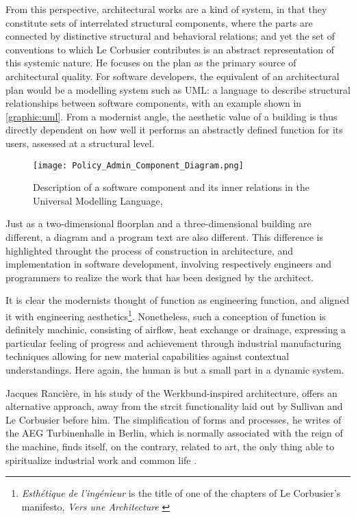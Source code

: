 From this perspective, architectural works are a kind of system, in that they constitute sets of interrelated structural components, where the parts are connected by distinctive structural and behavioral relations; and yet the set of conventions to which Le Corbusier contributes is an abstract representation of this systemic nature. He focuses on the plan as the primary source of architectural quality. For software developers, the equivalent of an architectural plan would be a modelling system such as UML: a language to describe structural relationships between software components, with an example shown in \autoref{graphic:uml}. From a modernist angle, the aesthetic value of a building is thus directly dependent on how well it performs an abstractly defined function for its users, assessed at a structural level.

\begin{figure}
    \texttt{[image: Policy\_Admin\_Component\_Diagram.png]}
    \caption{Description of a software component and its inner relations in the Universal Modelling Language, \citep{wikipedia_unified_2023}}
    \label{graphic:uml}
\end{figure}

Just as a two-dimensional floorplan and a three-dimensional building are different, a diagram and a program text are also different. This difference is highlighted throught the process of construction in architecture, and implementation in software development, involving respectively engineers and programmers to realize the work that has been designed by the architect.

It is clear the modernists thought of function as engineering function, and aligned it with engineering aesthetics\footnote{\emph{Esthétique de l'ingénieur} is the title of one of the chapters of Le Corbusier's manifesto, \emph{Vers une Architecture} \citep{lecorbusier_vers_1923}}. Nonetheless, such a conception of function is definitely machinic, consisting of airflow, heat exchange or drainage, expressing a particular feeling of progress and achievement through industrial manufacturing techniques allowing for new material capabilities against contextual understandings. Here again, the human is but a small part in a dynamic system.

Jacques Rancière, in his study of the Werkbund-inspired architecture, offers an alternative approach, away from the strcit functionality laid out by Sullivan and Le Corbusier before him. The simplification of forms and processes, he writes of the AEG Turbinenhalle in Berlin, which is normally associated with the reign of the machine, finds itself, on the contrary, related to art, the only thing able to spiritualize industrial work and common life \citep{ranciere_aisthesis_2013}.


